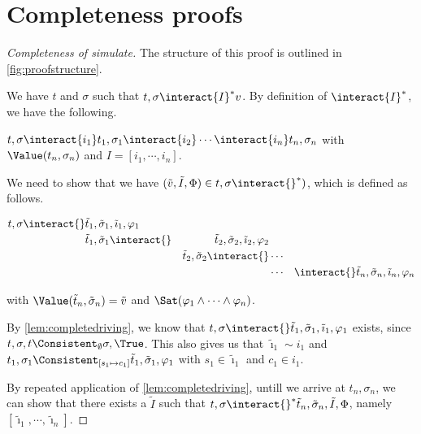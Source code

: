 
\section{Completeness proofs}
\label{sec:completenessproofs}

\begin{proof}[Completeness of simulate]
  The structure of this proof is outlined in \cref{fig:proofstructure}.

  We have $t$ and $\sigma$ such that $t,\sigma\interact{I}^*v$.
  By definition of $\interact{I}^*$, we have the following.

  $t,\sigma\interact{i_1}t_1,\sigma_1\interact{i_2}\cdots \interact{i_n}t_n,\sigma_n$ with $\Value(t_n,\sigma_n)$ and $I=[i_1,\cdots,i_n]$.

  We need to show that we have $(\tilde{v},\tilde{I},\Phi)\in t,\sigma\interact{}^*)$,
  which is defined as follows.

  \begin{align*}
      t,\sigma\interact{}&\tilde{t}_1,\tilde{\sigma}_1,\tilde{\imath}_1,\phi_1&\\
                      &\tilde{t}_1,\tilde{\sigma}_1\interact{}&\tilde{t}_2,\tilde{\sigma}_2,\tilde{\imath}_2,\phi_2\\
                      &                                    &\tilde{t}_2,\tilde{\sigma}_2\interact{}&\cdots&\\
                      &                                    &                                    &\cdots&
                      \interact{}\tilde{t}_n,\tilde{\sigma}_n,\tilde{\imath}_n,\phi_n
  \end{align*}

  with $\Value(\tilde{t}_n,\tilde{\sigma}_n)=\tilde{v}$ and $\Sat(\phi_1\land\cdots\land\phi_n)$.

  By \cref{lem:completedriving}, we know that $t,\sigma\interact{}\tilde{t}_1,\tilde{\sigma}_1,\tilde{\imath}_1,\phi_1$ exists,
  since $t,\sigma,t\Consistent_{\emptyset}\sigma,\True$.
  This also gives us that $\tilde{\imath}_1\sim i_1$ and $t_1,\sigma_1\Consistent_{[s_1\mapsto c_1]}\tilde{t}_1,\tilde{\sigma}_1,\phi_1$ with $s_1\in\tilde{\imath}_1$ and $c_1\in i_1$.

  By repeated application of \cref{lem:completedriving}, untill we arrive at $t_n,\sigma_n$,
  we can show that there exists a $\tilde{I}$ such that $t,\sigma\interact{}^*\tilde{t}_n,\tilde{\sigma}_n,\tilde{I},\Phi$,
  namely $[\tilde{\imath}_1,\cdots,\tilde{\imath}_n]$.

\end{proof}

